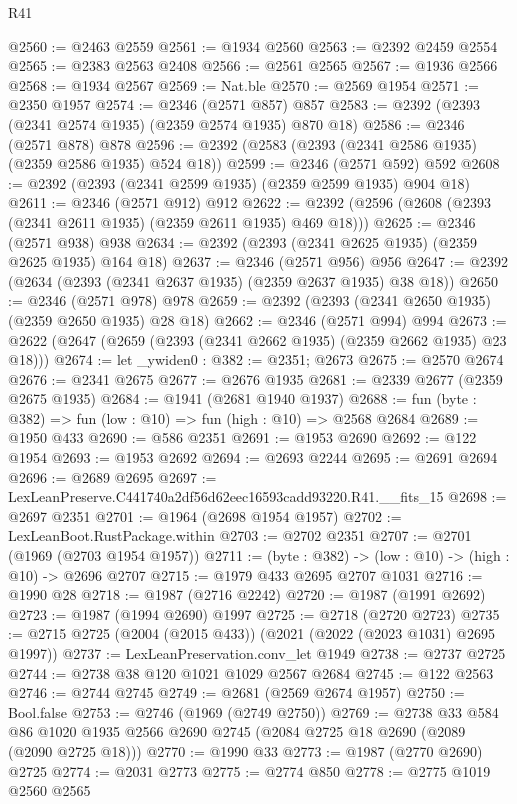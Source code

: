 \begin{lexlean}{R41}
\begin{coremodule}
@2560 := @2463 @2559
@2561 := @1934 @2560
@2563 := @2392 @2459 @2554
@2565 := @2383 @2563 @2408
@2566 := @2561 @2565
@2567 := @1936 @2566
@2568 := @1934 @2567
@2569 := Nat.ble
@2570 := @2569 @1954
@2571 := @2350 @1957
@2574 := @2346 (@2571 @857) @857
@2583 := @2392 (@2393 (@2341 @2574 @1935) (@2359 @2574 @1935) @870 @18)
@2586 := @2346 (@2571 @878) @878
@2596 := @2392 (@2583 (@2393 (@2341 @2586 @1935) (@2359 @2586 @1935) @524 @18))
@2599 := @2346 (@2571 @592) @592
@2608 := @2392 (@2393 (@2341 @2599 @1935) (@2359 @2599 @1935) @904 @18)
@2611 := @2346 (@2571 @912) @912
@2622 := @2392 (@2596 (@2608 (@2393 (@2341 @2611 @1935) (@2359 @2611 @1935) @469 @18)))
@2625 := @2346 (@2571 @938) @938
@2634 := @2392 (@2393 (@2341 @2625 @1935) (@2359 @2625 @1935) @164 @18)
@2637 := @2346 (@2571 @956) @956
@2647 := @2392 (@2634 (@2393 (@2341 @2637 @1935) (@2359 @2637 @1935) @38 @18))
@2650 := @2346 (@2571 @978) @978
@2659 := @2392 (@2393 (@2341 @2650 @1935) (@2359 @2650 @1935) @28 @18)
@2662 := @2346 (@2571 @994) @994
@2673 := @2622 (@2647 (@2659 (@2393 (@2341 @2662 @1935) (@2359 @2662 @1935) @23 @18)))
@2674 := let _ywiden0 : @382 := @2351; @2673
@2675 := @2570 @2674
@2676 := @2341 @2675
@2677 := @2676 @1935
@2681 := @2339 @2677 (@2359 @2675 @1935)
@2684 := @1941 (@2681 @1940 @1937)
@2688 := fun (byte : @382) => fun (low : @10) => fun (high : @10) => @2568 @2684
@2689 := @1950 @433
@2690 := @586 @2351
@2691 := @1953 @2690
@2692 := @122 @1954
@2693 := @1953 @2692
@2694 := @2693 @2244
@2695 := @2691 @2694
@2696 := @2689 @2695
@2697 := LexLeanPreserve.C441740a2df56d62eec16593cadd93220.R41.__fits_15
@2698 := @2697 @2351
@2701 := @1964 (@2698 @1954 @1957)
@2702 := LexLeanBoot.RustPackage.within
@2703 := @2702 @2351
@2707 := @2701 (@1969 (@2703 @1954 @1957))
@2711 := (byte : @382) -> (low : @10) -> (high : @10) -> @2696 @2707
@2715 := @1979 @433 @2695 @2707 @1031
@2716 := @1990 @28
@2718 := @1987 (@2716 @2242)
@2720 := @1987 (@1991 @2692)
@2723 := @1987 (@1994 @2690) @1997
@2725 := @2718 (@2720 @2723)
@2735 := @2715 @2725 (@2004 (@2015 @433)) (@2021 (@2022 (@2023 @1031) @2695 @1997))
@2737 := LexLeanPreservation.conv_let @1949
@2738 := @2737 @2725
@2744 := @2738 @38 @120 @1021 @1029 @2567 @2684
@2745 := @122 @2563
@2746 := @2744 @2745
@2749 := @2681 (@2569 @2674 @1957)
@2750 := Bool.false
@2753 := @2746 (@1969 (@2749 @2750))
@2769 := @2738
    @33
    @584
    @86
    @1020
    @1935
    @2566
    @2690
    @2745
    (@2084 @2725 @18 @2690 (@2089 (@2090 @2725 @18)))
@2770 := @1990 @33
@2773 := @1987 (@2770 @2690) @2725
@2774 := @2031 @2773
@2775 := @2774 @850
@2778 := @2775 @1019 @2560 @2565

\end{coremodule}
\end{lexlean}
